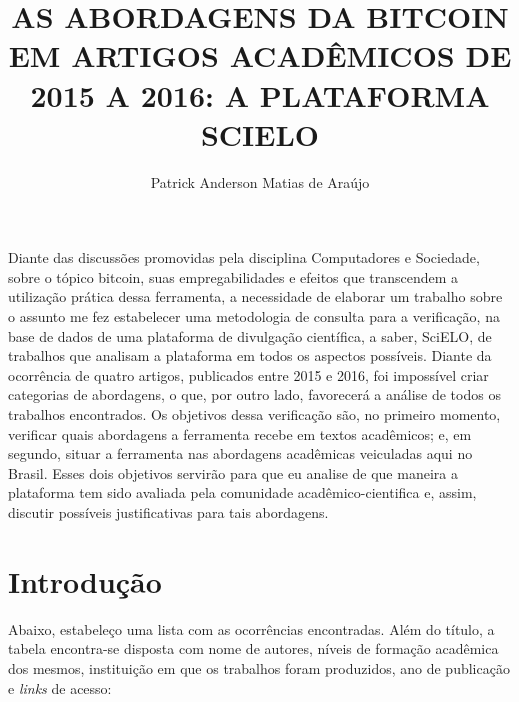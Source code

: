 \documentclass[12pt]{article}
\title{AS ABORDAGENS DA BITCOIN EM ARTIGOS ACADÊMICOS DE 2015 A 2016: A PLATAFORMA SCIELO}
\author{Patrick Anderson Matias de Araújo\inst{1}}
\begin{document}
 

\maketitle
     
\begin{resumo} 
  Diante das discussões promovidas pela disciplina Computadores e Sociedade, sobre o tópico bitcoin, suas empregabilidades e efeitos que transcendem a utilização prática dessa ferramenta, a necessidade de elaborar um trabalho sobre o assunto me fez estabelecer uma metodologia de consulta para a verificação, na base de dados de uma plataforma de divulgação científica, a saber, SciELO, de trabalhos que analisam a plataforma em todos os aspectos possíveis. Diante da ocorrência de quatro artigos, publicados entre 2015 e 2016, foi impossível criar categorias de abordagens, o que, por outro lado, favorecerá a análise de todos os trabalhos encontrados. Os objetivos dessa verificação são, no primeiro momento, verificar quais abordagens a ferramenta recebe em textos acadêmicos; e, em segundo, situar a ferramenta nas abordagens acadêmicas veiculadas aqui no Brasil. Esses dois objetivos servirão para que eu analise de que maneira a plataforma tem sido avaliada pela comunidade acadêmico-cientifica e, assim, discutir possíveis justificativas para tais abordagens.
\end{resumo}


\section{Introdução}

Abaixo, estabeleço uma lista com as ocorrências encontradas. Além do título, a tabela encontra-se disposta com nome de autores, níveis de formação acadêmica dos mesmos, instituição em que os trabalhos foram produzidos, ano de publicação e \textit{links} de acesso:
\end{document}
